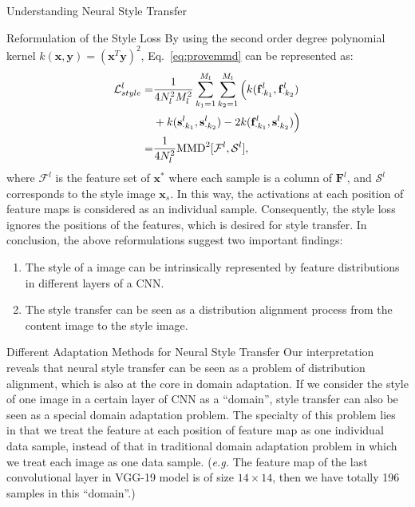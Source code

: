 \begin{section}{Understanding Neural Style Transfer}
\begin{subsection}{Reformulation of the Style Loss}
By using the second order degree polynomial kernel $k(\mathbf{x}, \mathbf{y}) = (\mathbf{x}^T\mathbf{y})^2$, Eq.~\ref{eq:provemmd} can be represented as:
\begin{equation}\label{eq:prove_result}
\begin{aligned}
\mathcal{L}_{style}^l =& \frac{1}{4N_l^2M_l^2}\sum_{k_1=1}^{M_l}\sum_{k_2=1}^{M_l}  
	\Big( k(\col{\mathbf{f}^l}{k_1}, \col{\mathbf{f}^l}{k_2}) \\
		 & + k(\col{\mathbf{s}^l}{k_1}, \col{\mathbf{s}^l}{k_2}) 
		 - 2k(\col{\mathbf{f}^l}{k_1}, \col{\mathbf{s}^l}{k_2})
	\Big)\\
	=& \frac{1}{4N_l^2} \text{MMD}^2[\mathcal{F}^{l}, \mathcal{S}^{l}],
\end{aligned}
\end{equation}
where $\mathcal{F}^{l}$ is the feature set of $\mathbf{x}^*$ where each sample is a column of $\mathbf{F}^l$, and $\mathcal{S}^{l}$ corresponds to the style image $\mathbf{x}_s$. In this way, the activations at each position of feature maps is considered as an individual sample. Consequently, the style loss ignores the positions of the features, which is desired for style transfer. In conclusion, the above reformulations suggest two important findings:
\begin{enumerate}
\item The style of a image can be intrinsically represented by feature distributions in different layers of a CNN.
\item The style transfer can be seen as a distribution alignment process from the content image to the style image. 
\end{enumerate}
\end{subsection}

\begin{subsection}{Different Adaptation Methods for Neural Style Transfer}\label{sec:methods}
Our interpretation reveals that neural style transfer can be seen as a problem of distribution alignment, which is also at the core in domain adaptation. If we consider the style of one image in a certain layer of CNN as a ``domain'', style transfer can also be seen as a special domain adaptation problem. The specialty of this problem lies in that we treat the feature at each position of feature map as one individual data sample, instead of that in traditional domain adaptation problem in which we treat each image as one data sample. (\emph{e.g.} The feature map of the last convolutional layer in VGG-19 model is of size $14 \times 14$, then we have totally 196 samples in this ``domain''.)


\end{subsection}
\end{section}
